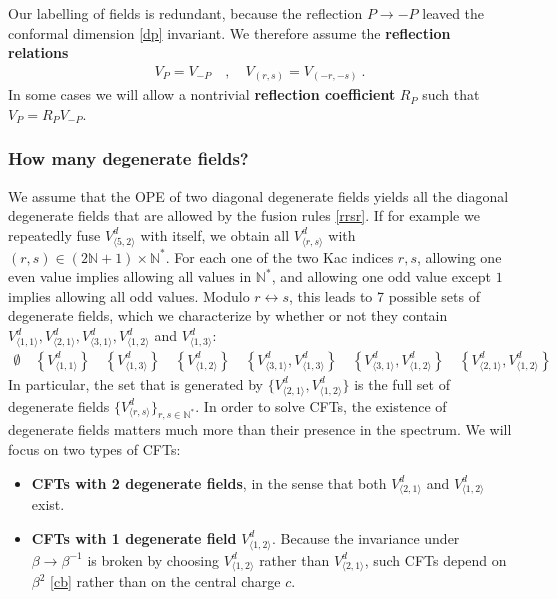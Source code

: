 \documentclass[12pt, a4paper]{article}
\theoremstyle{break}
\begin{document}
Our labelling of fields is redundant, because the reflection $P\to -P$ leaved the conformal dimension \eqref{dp} invariant. We therefore assume the \textbf{reflection relations}
\begin{align}
 V_{P} = V_{-P} \quad , \quad V_{(r,s)} = V_{(-r,-s)} \ . 
 \label{refl}
\end{align}
In some cases we will allow a nontrivial \textbf{reflection coefficient} $R_P$ such that $V_P=R_P V_{-P}$. 


\subsubsection{How many degenerate fields?}\label{sec:hmdf}

We assume that the OPE of two diagonal degenerate fields yields all the diagonal degenerate fields that are allowed by the fusion rules \eqref{rrsr}. 
If for example we repeatedly fuse $V^d_{\langle 5,2\rangle}$ with itself, we obtain all $V^d_{\langle r,s\rangle}$ with $(r,s)\in (2\mathbb{N}+1)\times \mathbb{N}^*$. For each one of the two Kac indices $r,s$, allowing one even value implies allowing all values in $\mathbb{N}^*$, and allowing one odd value except $1$ implies allowing all odd values. Modulo $r\leftrightarrow s$, this leads to 7 possible sets of degenerate fields, which we characterize by whether or not they contain $V^d_{\langle 1,1\rangle}, V^d_{\langle 2,1\rangle},V^d_{\langle 3,1\rangle},V^d_{\langle 1,2\rangle}$ and $V^d_{\langle 1,3\rangle}$:
\begin{align}
  \emptyset \quad \left\{V^d_{\langle 1,1\rangle}\right\}  \quad \left\{V^d_{\langle 1,3\rangle}\right\} \quad \left\{V^d_{\langle 1,2\rangle}\right\} 
  \quad 
  \left\{V^d_{\langle 3,1\rangle},V^d_{\langle 1,3\rangle}\right\} \quad 
  \left\{V^d_{\langle 3,1\rangle},V^d_{\langle 1,2\rangle}\right\} \quad 
  \left\{V^d_{\langle 2,1\rangle},V^d_{\langle 1,2\rangle}\right\} 
 \label{degsets}
\end{align}
In particular, the set that is generated by $\{V^d_{\langle 2,1\rangle},V^d_{\langle 1,2\rangle}\} $ is the full set of degenerate fields $\{V^d_{\langle r,s\rangle}\}_{r,s\in\mathbb{N}^*}$. 
In order to solve CFTs, the existence of degenerate fields matters much more than their presence in the spectrum. We will focus on two types of CFTs:
\begin{itemize}
 \item \textbf{CFTs with 2 degenerate fields}, in the sense that both $V^d_{\langle 2,1\rangle}$ and $V^d_{\langle 1,2\rangle}$ exist. 
 \item \textbf{CFTs with 1 degenerate field} $V^d_{\langle 1,2\rangle}$. Because the invariance under $\beta\to \beta^{-1}$ is broken by choosing $V^d_{\langle 1,2\rangle}$ rather than $V^d_{\langle 2,1\rangle}$, such CFTs depend on $\beta^2$ \eqref{cb} rather than on the central charge $c$. 
\end{itemize}
\end{document}
